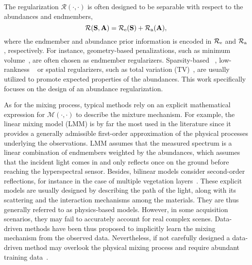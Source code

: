 \documentclass[journal,a4paper]{IEEEtran}
\newcommand{\MATabund}{\mathbf{A}}
\newcommand{\MATend}{\mathbf{S}}
\begin{document}
The regularization $\mathcal{R}(\cdot,\cdot)$ is often designed to be separable with respect to the abundances and endmembers,
\begin{equation}\label{eq.reg}
  \mathcal{R}(\MATend,\MATabund)=\mathcal{R}_{\rm e}(\MATend)+\mathcal{R}_{\rm a}(\MATabund),
\end{equation}
where the endmember and abundance prior information is encoded in $\mathcal{R}_{\rm e}$ and $\mathcal{R}_{\rm a}$, respectively. For instance, geometry-based penalizations, such as minimum volume~\cite{miao2007endmember}, are often chosen as endmember regularizers. Sparsity-based ~\cite{iordache2013collaborative}, low-rankness ~\cite{giampouras2016simultaneously} or spatial regularizers, such as total variation (TV)~\cite{iordache2012total}, are usually utilized to promote expected properties of the  abundances. This work  specifically focuses on the design of an abundance regularization. %

As for the mixing process, typical methods rely on an explicit mathematical expression for $\mathcal{M}(\cdot,\cdot)$ to describe the mixture mechanism. For example, the linear mixing model (LMM) is by far the most used in the literature since it provides a generally admissible first-order approximation of the physical processes underlying the observations. LMM assumes that the measured spectrum is a linear combination of endmembers weighted by the abundances, which assumes that the incident light comes in and only reflects once on the ground before reaching the hyperspectral sensor. Besides, bilinear models consider second-order reflections, for instance in the case of multiple vegetation layers~\cite{halimi2011nonlinear,Dobigeon_IEEE_JSTARS_2014}. These explicit models are usually designed by describing the path of the light, along with its scattering and the interaction mechanisms among the materials. They are thus generally referred to as physics-based models. However, in some acquisition scenarios, they may fail to accurately account for real complex scenes. Data-driven methods have been thus proposed to implicitly learn the mixing mechanism from the observed data. Nevertheless, if not carefully designed a data-driven method may overlook the physical mixing process and require abundant training data~\cite{chen2023integration}.%

\end{document}
